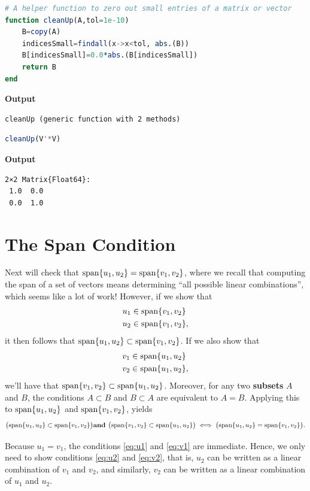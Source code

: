 \begin{lstlisting}[language=Julia,style=mystyle]
# A helper function to zero out small entries of a matrix or vector
function cleanUp(A,tol=1e-10)
    B=copy(A)
    indicesSmall=findall(x->x<tol, abs.(B))
    B[indicesSmall]=0.0*abs.(B[indicesSmall])
    return B
end
\end{lstlisting}
\textbf{Output} 
\begin{verbatim}
cleanUp (generic function with 2 methods)
\end{verbatim}


\begin{lstlisting}[language=Julia,style=mystyle]
cleanUp(V'*V)
\end{lstlisting}
\textbf{Output} 
\begin{verbatim}
2×2 Matrix{Float64}:
 1.0  0.0
 0.0  1.0
\end{verbatim}

\section{The Span Condition}

Next will check that $\mathrm{span} \{ u_1, u_2 \} = \mathrm{span} \{ v_1, v_2 \}$, where we recall that computing the span of a set of vectors means determining ``all possible linear combinations'', which seems like a lot of work! However, if we show that
\begin{align}
\label{eq:u1}
    u_1 & \in \mathrm{span} \{ v_1, v_2 \}\\
\label{eq:u2}
    u_2 & \in \mathrm{span} \{ v_1, v_2 \},
\end{align}
it then follows that $\mathrm{span} \{ u_1, u_2 \} \subset \mathrm{span} \{ v_1, v_2 \}$. If we also show that
\begin{align}
\label{eq:v1}
    v_1 & \in \mathrm{span} \{ u_1, u_2 \} \\
\label{eq:v2}
    v_2 & \in \mathrm{span} \{ u_1, u_2 \}, 
\end{align}
we'll have that $\mathrm{span} \{ v_1, v_2 \} \subset \mathrm{span} \{ u_1, u_2 \}$. Moreover, for any two \textbf{subsets} $A$ and $B$, the conditions $A \subset B$ and $B \subset A$ are equivalent to $A=B$. Applying this to $\mathrm{span} \{ u_1, u_2 \}$ and $\mathrm{span} \{ v_1, v_2 \}$, yields
$$\big(\mathrm{span} \{ u_1, u_2 \} \subset \mathrm{span} \{ v_1, v_2 \}\big) \text{\bf and } \big(\mathrm{span} \{ v_1, v_2 \} \subset \mathrm{span} \{ u_1, u_2 \} \big) \iff \big(\mathrm{span} \{ u_1, u_2 \} = \mathrm{span} \{ v_1, v_2 \}\big).$$

Because $u_1 = v_1$, the conditions \eqref{eq:u1} and \eqref{eq:v1} are immediate. Hence, we only need to show conditions \eqref{eq:u2} and \eqref{eq:v2}, 
that is, $u_2$ can be written as a linear combination of $v_1$ and $v_2$, and similarly, $v_2$ can be written as a linear combination of $u_1$ and $u_2$.\\

